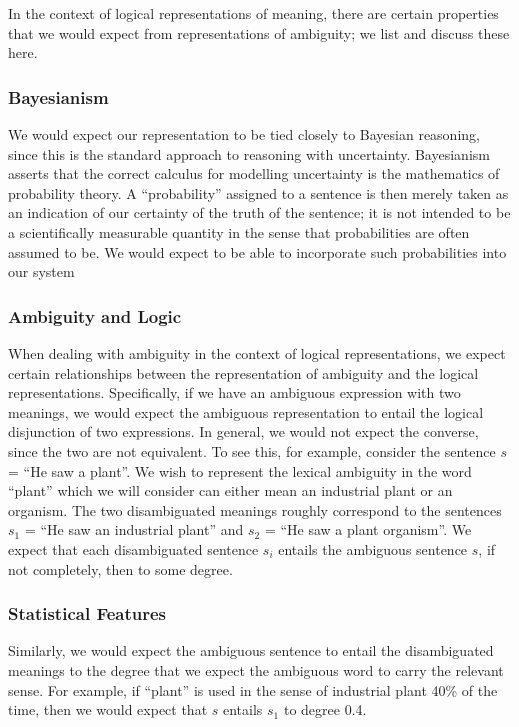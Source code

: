 In the context of logical representations of meaning, there are certain properties that we would expect from representations of ambiguity; we list and discuss these here.

\subsubsection*{Bayesianism}

We would expect our representation to be tied closely to Bayesian reasoning, since this is the standard approach to reasoning with uncertainty. Bayesianism asserts that the correct calculus for modelling uncertainty is the mathematics of probability theory. A ``probability'' assigned to a sentence is then merely taken as an indication of our certainty of the truth of the sentence; it is not intended to be a scientifically measurable quantity in the sense that probabilities are often assumed to be. We would expect to be able to incorporate such probabilities into our system

\subsubsection*{Ambiguity and Logic}

When dealing with ambiguity in the context of logical representations, we expect certain relationships between the representation of ambiguity and the logical representations. Specifically, if we have an ambiguous expression with two meanings, we would expect the ambiguous representation to entail the logical disjunction of two expressions. In general, we would not expect the converse, since the two are not equivalent. To see this, for example, consider the sentence $s$ = ``He saw a plant''. We wish to represent the lexical ambiguity in the word ``plant'' which we will consider can either mean an industrial plant or an organism. The two disambiguated meanings roughly correspond to the sentences $s_1$ = ``He saw an industrial plant'' and $s_2$ = ``He saw a plant organism''. We expect that each disambiguated sentence $s_i$ entails the ambiguous sentence $s$, if not completely, then to some degree. 

\subsubsection*{Statistical Features}

Similarly, we would expect the ambiguous sentence to entail the disambiguated meanings to the degree that we expect the ambiguous word to carry the relevant sense. For example, if ``plant'' is used in the sense of industrial plant 40\% of the time, then we would expect that $s$ entails $s_1$ to degree 0.4.


